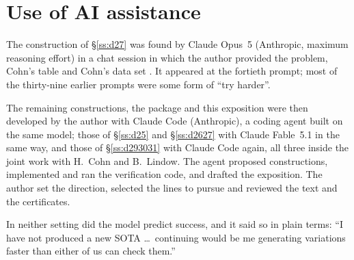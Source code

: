 \documentclass[11pt]{amsart}
\theoremstyle{remark}
\begin{document}
\section*{Use of AI assistance}

The construction of \S\ref{ss:d27} was found by Claude Opus~5 (Anthropic, maximum
reasoning effort) in a chat session in which the author provided the problem,
Cohn's table \cite{cohn-table} and Cohn's data set \cite{cohn-data}. It appeared
at the fortieth prompt; most of the thirty-nine earlier prompts were some form of
``try harder''.

The remaining constructions, the package \cite{repo} and this exposition were then
developed by the author with Claude Code (Anthropic), a coding agent built on the
same model; those of \S\ref{ss:d25} and \S\ref{ss:d2627} with Claude Fable~5.1
in the same way, and those of \S\ref{ss:d293031} with Claude Code again, all
three inside the joint work with H.~Cohn and B.~Lindow. The agent proposed constructions, implemented and ran the verification
code, and drafted the exposition. The author set the direction, selected the lines
to pursue and reviewed the text and the certificates.

In neither setting did the model predict success, and it said so in plain terms:
``I have not produced a new SOTA \dots\ continuing would be me generating
variations faster than either of us can check them.''



\end{document}
